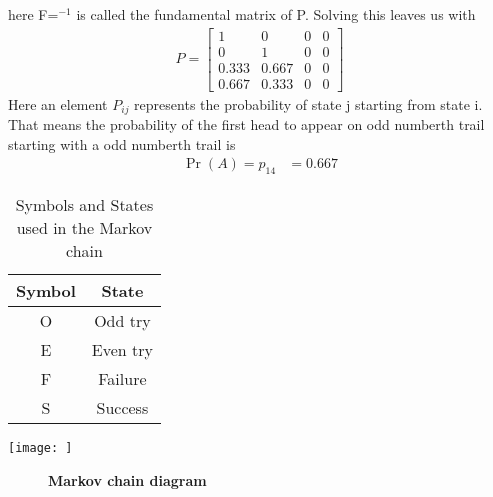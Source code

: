 \documentclass[journal,12pt,twocolumn]{IEEEtran}
\begin{document}
here F=$^{-1}$ is called the fundamental matrix of P. Solving this leaves us with 
\begin{align}
P = 
\begin{bmatrix}
1 & 0 & 0 & 0 \\
0 & 1 & 0 & 0 \\
0.333 & 0.667 & 0 & 0 \\
0.667 & 0.333 & 0 & 0
\end{bmatrix}
\end{align}
Here an element $P_{ij}$ represents the probability of state j starting from state i. That means the probability of the first head to appear on odd numberth trail starting with a odd numberth trail is  
\begin{align}
   \Pr(A) = p_{14} 
   & = 0.667
\end{align}

\begin{table}
\centering
\begin{tabular}{|c|c|}
\hline
Symbol & State  \\ \hline
O                      & Odd try     \\ \hline
E                      & Even try    \\ \hline
F                      & Failure     \\ \hline
S                      & Success     \\ \hline
\end{tabular}
\caption{Symbols and States used in the Markov chain}
\label{tab:Table 5.10}
\end{table}

\centering
\texttt{[image: ]}
\begin{figure}[h]
\caption*{\textbf{Markov chain diagram}}
\centering
{}
\end{figure}
\end{document}
